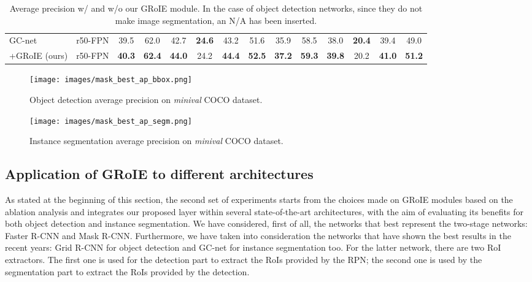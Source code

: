 \documentclass[10pt,conference,a4paper]{IEEEtran}
\begin{document}
\begin{table*}
\begin{center}
\begin{tabular}{l|c||c|c|c|c|c|c||c|c|c|c|c|c}
      \hline\hline
      GC-net        & r50-FPN & 39.5 & 62.0 & 42.7 & \textbf{24.6} & 43.2 & 51.6 & 35.9 & 58.5 & 38.0 & \textbf{20.4} & 39.4 & 49.0 \\
      +GRoIE (ours) & r50-FPN & \textbf{40.3} & \textbf{62.4} & \textbf{44.0} & 24.2 & \textbf{44.4} & \textbf{52.5} & \textbf{37.2} & \textbf{59.3} & \textbf{39.8} & 20.2 & \textbf{41.0} & \textbf{51.2} \\
    \end{tabular}
  \end{center}
  \caption{Average precision w/ and w/o our GRoIE module.
  	       In the case of object detection networks, since they do not make image segmentation, an N/A has been inserted.}
  \label{sota-coco-bbox-mask-results}
\end{table*}

\begin{figure}[t]
  \begin{center}
    \texttt{[image: images/mask\_best\_ap\_bbox.png]}
  \end{center}
  \caption{Object detection average precision on \textit{minival} COCO dataset.}
  \label{fig:mask_best_ap_bbox}
\end{figure}

\begin{figure}[t]
  \begin{center}
    \texttt{[image: images/mask\_best\_ap\_segm.png]}
  \end{center}
  \caption{Instance segmentation average precision on \textit{minival} COCO dataset.}
  \label{fig:mask_best_ap_segm}
\end{figure}

\subsection{Application of GRoIE to different architectures}
\label{Model ablation study}
As stated at the beginning of this section, the second set of experiments starts from the choices made on GRoIE modules based on the ablation analysis and integrates our proposed layer within several state-of-the-art architectures, with the aim of evaluating its benefits for both object detection and instance segmentation.
We have considered, first of all, the networks that best represent the two-stage networks: Faster R-CNN and Mask R-CNN.
Furthermore, we have taken into consideration the networks that have shown the best results in the recent years: Grid R-CNN \cite{lu2019grid} for object detection and GC-net \cite{cao2019gcnet} for instance segmentation too.
For the latter network, there are two RoI extractors. 
The first one is used for the detection part to extract the RoIs provided by the RPN;
the second one is used by the segmentation part to extract the RoIs provided by the detection.
\end{document}
